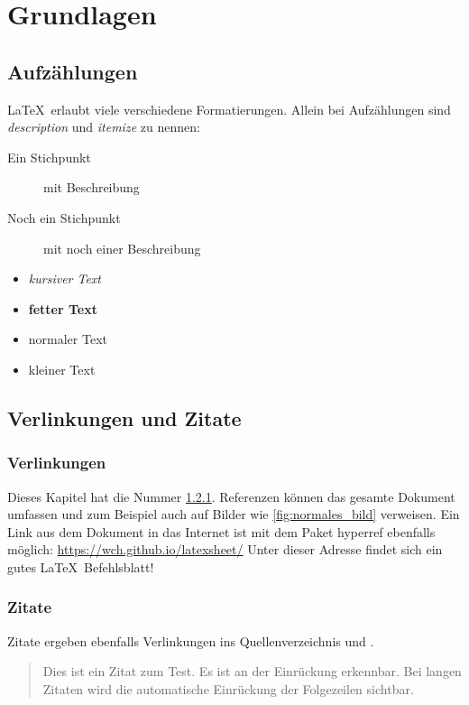 \chapter{Grundlagen}
\label{ch:grundlagen}

\section{Aufzählungen}
\label{sec:aufzaehlungen}

\LaTeX ~erlaubt viele verschiedene Formatierungen. Allein bei Aufzählungen sind \textit{description} und \textit{itemize} zu nennen:
\begin{description}
	\item[Ein Stichpunkt]
	mit Beschreibung
	\item[Noch ein Stichpunkt]
	mit noch einer Beschreibung
\end{description}

\begin{itemize}
\item \textit{kursiver Text}
\item \textbf{fetter Text}
\item normaler Text
\item \tiny kleiner Text
\end{itemize}


\section{Verlinkungen und Zitate}
\subsection{Verlinkungen}
\label{subsec:verlinkungen}

Dieses Kapitel hat die Nummer \ref{subsec:verlinkungen}. Referenzen können das gesamte Dokument umfassen und zum Beispiel auch auf Bilder wie \ref{fig:normales_bild} verweisen.\newline
Ein Link aus dem Dokument in das Internet ist mit dem Paket hyperref ebenfalls möglich: \newline\url{https://wch.github.io/latexsheet/}\newline
Unter dieser Adresse findet sich ein gutes \LaTeX ~Befehlsblatt!

\subsection{Zitate}
\label{subsec:zitate}
Zitate ergeben ebenfalls Verlinkungen ins Quellenverzeichnis \cite{rfid_handbuch} und \cite[S.10]{tietze_schenk}.
\begin{quote}
Dies ist ein Zitat zum Test. Es ist an der Einrückung erkennbar. Bei langen Zitaten wird die automatische Einrückung der Folgezeilen sichtbar.
\end{quote}



